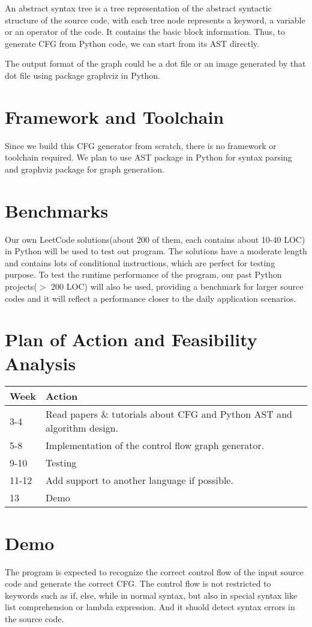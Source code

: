 \documentclass[11pt]{article}
\begin{document}
An abstract syntax tree is a tree representation of the abstract syntactic structure of the source code, with each tree node represents a keyword, a variable or an operator of the code. It contains the basic block information. Thus, to generate CFG from Python code, we can start from its AST directly. 

The output format of the graph could be a dot file or an image generated by that dot file using package graphviz in Python.

\section{Framework and Toolchain}\label{section-framework}
Since we build this CFG generator from scratch, there is no framework or toolchain required. We plan to use AST package in Python for syntax parsing and graphviz package for graph generation.

\section{Benchmarks}\label{section-benchmarks}
Our own LeetCode solutions(about 200 of them, each contains about 10-40 LOC) in Python will be used to test out program. The solutions have a moderate length and contains lots of conditional instructions, which are perfect for testing purpose. To test the runtime performance of the program, our past Python projects($>$ 200 LOC) will also be used, providing a benchmark for larger source codes and it will reflect a performance closer to the daily application scenarios. 

\section{Plan of Action and Feasibility Analysis}\label{section-plan}
\begin{tabular}{| l | l |}
\hline
Week & Action  \\ \hline
3-4 & Read papers \& tutorials about CFG and Python AST and algorithm design. \\ \hline
5-8 & Implementation of the control flow graph generator.  \\ \hline
9-10 & Testing  \\ \hline
11-12 & Add support to another language if possible.  \\ \hline
13 & Demo  \\ \hline
\end{tabular}

\section{Demo}\label{section-demo}
The program is expected to recognize the correct control flow of the input source code and generate the correct CFG. The control flow is not restricted to keywords such as if, else, while in normal syntax, but also in special syntax like list comprehension or lambda expression. And it shuold detect syntax errors in the source code.
\end{document}

